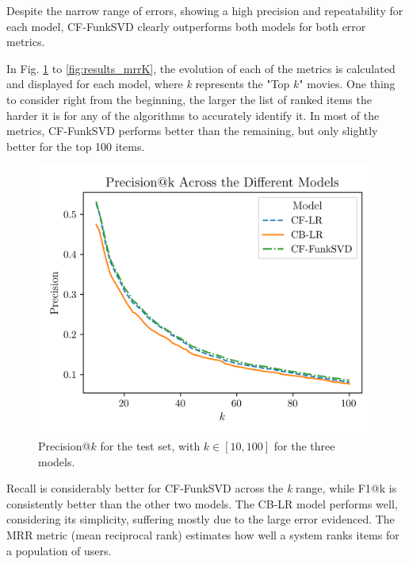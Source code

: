 \documentclass[conference]{IEEEtran}
\begin{document}
Despite the narrow range of errors, showing a high precision and repeatability for each model, CF-FunkSVD clearly outperforms both models for both error metrics.

In Fig. \ref{fig:results_precisionK} to \ref{fig:results_mrrK}, the evolution of each of the metrics is calculated and displayed for each model, where \textit{k} represents the "Top $k$" movies. One thing to consider right from the beginning, the larger the list of ranked items the harder it is for any of the algorithms to accurately identify it. In most of the metrics, CF-FunkSVD performs better than the remaining, but only slightly better for the top 100 items.


\begin{figure}[H]
    \centering
    \includegraphics[width=1\linewidth]{assets/results_precisionK.png}
    \caption{Precision@$k$ for the test set, with $k \in [10,100]$ for the three models.}
    \label{fig:results_precisionK}
\end{figure}

Recall is considerably better for CF-FunkSVD across the \textit{k} range, while F1@k is consistently better than the other two models. The CB-LR model performs well, considering its simplicity, suffering mostly due to the large error evidenced. The MRR metric (mean reciprocal rank) estimates how well a system ranks items for a population of users.
\end{document}
